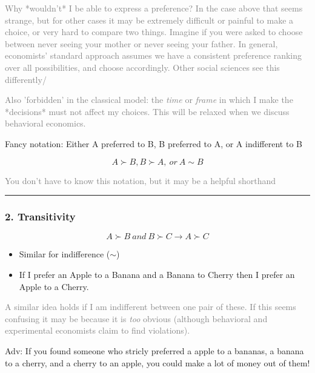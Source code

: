 \documentclass[]{article}
\begin{document}
\textcolor{gray}{Why *wouldn't* I be able to express a preference? In the case above that seems strange, but for other cases it may be extremely difficult or painful to make a choice, or very hard to compare two things. Imagine if you were asked to choose between never seeing your mother or never seeing your father. In general, economists' standard approach assumes we have a consistent preference ranking over all possibilities, and choose accordingly.  Other social sciences see this differently/}

\textcolor{gray}{Also 'forbidden' in the classical model: the \emph{time} or \emph{frame} in which I make the *decisions* must not affect my choices. This will be relaxed when we discuss behavioral economics.}

\medskip

Fancy notation: Either A preferred to B, B preferred to A, or A indifferent to B

\[A \succ B, B \succ A, \: or \: A \sim B \]

\bigskip

\textcolor{gray}{You don't have to know this notation, but it may be a helpful shorthand}

\begin{center}\rule{0.5\linewidth}{\linethickness}\end{center}

\hypertarget{transitivity}{%
\subsubsection{2. Transitivity}\label{transitivity}}

\[ A \succ B \: and \: B \succ C \rightarrow A \succ C \]

\begin{itemize}
\item
  Similar for indifference (\(\sim\))
\item
  If I prefer an Apple to a Banana and a Banana to Cherry then I prefer an Apple to a Cherry.
\end{itemize}

\textcolor{gray}{A similar idea holds if I am indifferent between one pair of these. If this seems confusing it may be because it is \emph{too} obvious (although behavioral and experimental economists claim to find violations).}

\textcolor{RawSienna}{Adv: If you found someone who stricly preferred a apple to a bananas, a banana to a cherry, and a cherry to an apple,  you could make a lot of money out of them!}
\end{document}
